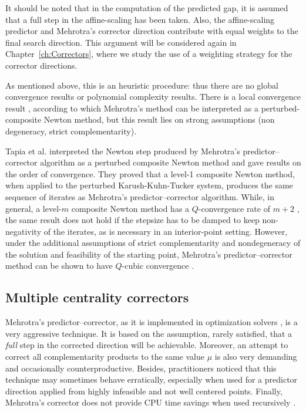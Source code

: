 It should be noted that in the computation of the predicted gap, 
it is assumed that a full step in the affine-scaling has been taken. 
Also, the affine-scaling predictor and Mehrotra's corrector direction 
contribute with equal weights to the final search direction. 
This argument will be considered again in Chapter~\ref{ch:Correctors}, 
where we study the use of a weighting strategy for the corrector
directions.

As mentioned above, this is an heuristic procedure: thus there are 
no global convergence results or polynomial complexity results. 
There is a local convergence result \cite{TapiaZhangSaltzmanWeiser}, 
according to which Mehrotra's method can be interpreted as a 
perturbed-composite Newton method, but this result lies on strong 
assumptions (non degeneracy, strict complementarity).

Tapia et al. \cite{TapiaZhangSaltzmanWeiser} interpreted the Newton step 
produced by Mehrotra's predictor--corrector algorithm as a perturbed
composite Newton method and gave results on the order of convergence. 
They proved that a level-1 composite Newton method, when applied 
to the perturbed Karush-Kuhn-Tucker system, produces the same 
sequence of iterates as Mehrotra's predictor--corrector algorithm. 
While, in general, a level-$m$ composite Newton method has 
a $Q$-convergence rate of $m+2$ \cite{OrtegaRheinboldt},
the same result does not hold 
if the stepsize has to be damped to keep non-negativity of the iterates, 
as is necessary in an interior-point setting. However, under 
the additional assumptions of strict complementarity and nondegeneracy 
of the solution and feasibility of the starting point, Mehrotra's 
predictor--corrector method can be shown to have $Q$-cubic convergence
\cite{TapiaZhangSaltzmanWeiser}.

%
%
\subsection{Multiple centrality correctors}
\label{ss:MultipleCC}

Mehrotra's predictor--corrector, as it is implemented in optimization 
solvers \cite{LustigMarstenShanno,Mehrotra92}, is a very aggressive 
technique. It is based on the assumption, rarely satisfied, that a 
{\it full} step in the corrected direction will be achievable.
Moreover, an attempt to correct all complementarity products to the 
same value $\mu$ is also very demanding and occasionally
counterproductive. 
Besides, practitioners noticed that this technique may sometimes 
behave erratically, especially when used for a predictor direction 
applied from highly infeasible and not well centered points. 
Finally, Mehrotra's corrector does not provide CPU time savings 
when used recursively \cite{CarpenterLustigMulveyShanno}.

